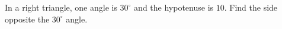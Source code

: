 In a right triangle, one angle is $30^\circ$ and the hypotenuse is $10$. Find the side opposite the $30^\circ$ angle.
